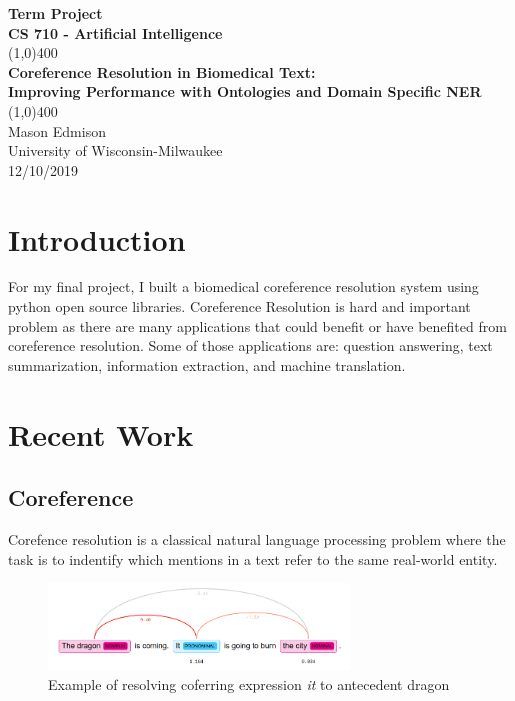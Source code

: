 \documentclass[11pt]{article}
\begin{document}
\begin{titlepage}
\begin{center}
\Large{\textbf{Term Project}} \\
\Large{\textbf{CS 710 - Artificial Intelligence}} \\

\vfill
\line(1,0){400} \\

\Large{\textbf{Coreference Resolution in Biomedical Text:}} \\
\Large{\textbf{Improving Performance with Ontologies and Domain Specific NER}} \\

\line(1,0){400}\\
\vfill
Mason Edmison\\
University of Wisconsin-Milwaukee\\
12/10/2019
\end{center}
\end{titlepage}

\section{Introduction}
For my final project, I built a biomedical coreference resolution system using python open source libraries. Coreference Resolution is hard and important problem as there are many applications that could benefit or have benefited from coreference resolution. Some of those applications are: question answering, text summarization, information extraction, and machine translation.

\section{Recent Work}

\subsection{Coreference}
Corefence resolution is a classical natural language processing problem where the task is to indentify which mentions in a text refer to the same real-world entity. 

\begin{figure}[h]
\includegraphics[width=8cm]{coref_vis}
\centering
\caption{Example of resolving coferring expression \textit{it} to antecedent {dragon}}
\end{figure}
\end{document}
